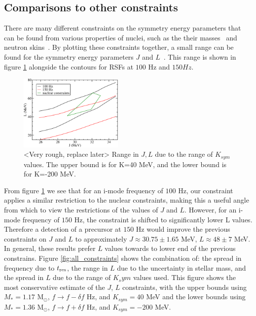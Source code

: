\documentclass[fleqn,usenatbib]{mnras}
\begin{document}
\subsection{Comparisons to other constraints}
\hspace{\parindent}There are many different constraints on the symmetry energy parameters that can be found from various properties of nuclei, such as the their masses~\cite{kortelainen2010nuclear} and neutron skins~\cite{chen2010density}. By plotting these constraints together, a small range can be found for the symmetry energy parameters $J$ and $L$~\cite{balantekin2014nuclear}. This range is shown in figure \ref{fig:constraints} alongside the contours for RSFs at $100$ Hz and $150 Hz$. %

\begin{figure}
\centering
\includegraphics[width=0.45\textwidth,angle=0]{constraints_rough_2}
\caption{<Very rough, replace later> Range in $J,L$ due to the range of $K_{sym}$ values. The upper bound is for K=40 MeV, and the lower bound is for K=-200 MeV.}
\label{fig:constraints}
\end{figure}

\hspace{\parindent}From figure \ref{fig:constraints} we see that for an i-mode frequency of $100$ Hz, our constraint applies a similar restriction to the nuclear constraints, making this a useful angle from which to view the restrictions of the values of $J$ and $L$. However, for an i-mode frequency of $150$ Hz, the constraint is shifted to significantly lower L values. Therefore a detection of a precursor at $150$ Hz would improve the previous constraints on $J$ and $L$ to approximately $J\approx 30.75\pm 1.65$ MeV, $L\approx 48\pm 7$ MeV. In general, these results prefer $L$ values towards to lower end of the previous constrains. Figure \ref{fig:all_constraints} shows the combination of: the spread in frequency due to $t_{\rm res}$, the range in $L$ due to the uncertainty in stellar mass, and the spread in $L$ due to the range of $K_sym$ values used. This figure shows the most conservative estimate of the $J$, $L$ constraints, with the upper bounds using $M_*=1.17$ M$_{\odot}$, $f\rightarrow f-\delta f$ Hz, and $K_{sym}=40$ MeV and the lower bounds using $M_*=1.36$ M$_{\odot}$, $f\rightarrow f+\delta f$ Hz, and $K_{sym}=-200$ MeV.
\end{document}
